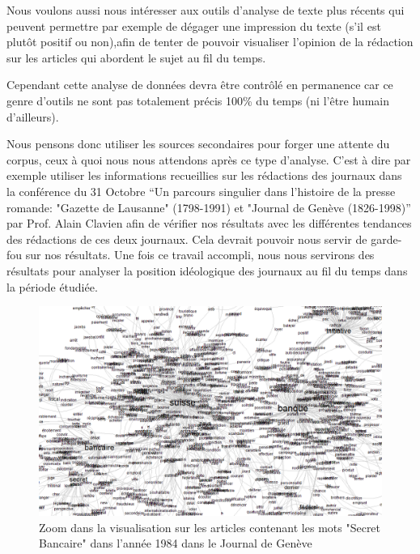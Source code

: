 \documentclass[11pt]{article}
\begin{document}
Nous voulons aussi nous intéresser aux outils d’analyse de texte plus récents 
qui peuvent permettre par exemple de dégager une impression du texte (s’il est 
plutôt positif ou non),afin de tenter de pouvoir visualiser l’opinion de la 
rédaction sur les articles qui abordent le sujet au fil du temps.
    
Cependant cette analyse de données devra être contrôlé en permanence car ce
genre d’outils ne sont pas totalement précis 100\% du temps (ni l’être humain
d’ailleurs).
    
Nous pensons donc utiliser les sources secondaires pour forger une attente du
corpus, ceux à quoi nous nous attendons après ce type d’analyse. C’est à dire
par exemple utiliser les informations recueillies sur les rédactions des
journaux dans la conférence du 31 Octobre “Un parcours singulier dans l'histoire
de la presse romande: "Gazette de Lausanne" (1798-1991) et "Journal de Genève
(1826-1998)” par Prof. Alain Clavien afin de vérifier nos résultats avec les
différentes tendances des rédactions de ces deux journaux. Cela devrait pouvoir
nous servir de garde-fou sur nos résultats. Une fois ce travail accompli, nous
nous servirons des résultats pour analyser la position idéologique des journaux
au fil du temps dans la période étudiée. 

\begin{figure}
  \includegraphics[width=7in]{reduced.png}
  \caption{Zoom dans la visualisation sur les articles contenant les mots
"Secret Bancaire" dans l'année 1984 dans le Journal de Genève}
\end{figure}



\end{document}
